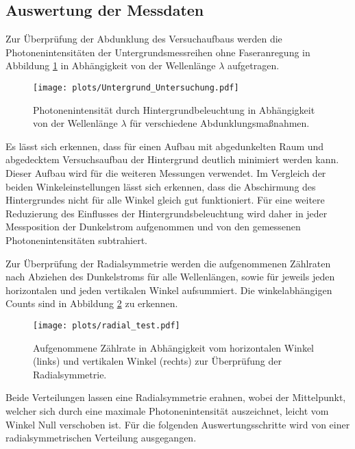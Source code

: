 \subsection{Auswertung der Messdaten}
Zur Überprüfung der Abdunklung des Versuchaufbaus werden die Photonenintensitäten der Untergrundsmessreihen ohne Faseranregung in Abbildung \ref{fig:Untergrund_Untersuchung} in Abhängigkeit von der Wellenlänge $\lambda$ aufgetragen.
\begin{figure}
    \centering
    \texttt{[image: plots/Untergrund\_Untersuchung.pdf]}
    \caption{Photonenintensität durch Hintergrundbeleuchtung in Abhängigkeit von der Wellenlänge $\lambda$ für verschiedene Abdunklungsmaßnahmen.}
    \label{fig:Untergrund_Untersuchung}
\end{figure}
\FloatBarrier
Es lässt sich erkennen, dass für einen Aufbau mit abgedunkelten Raum und abgedecktem Versuchsaufbau der Hintergrund deutlich minimiert werden kann. Dieser Aufbau wird für die weiteren Messungen verwendet. 
Im Vergleich der beiden Winkeleinstellungen lässt sich erkennen, dass die Abschirmung des Hintergrundes nicht für alle Winkel gleich gut funktioniert. 
Für eine weitere Reduzierung des Einflusses der Hintergrundsbeleuchtung wird daher in jeder Messposition der Dunkelstrom aufgenommen und von den gemessenen Photonenintensitäten subtrahiert.

Zur Überprüfung der Radialsymmetrie werden die aufgenommenen Zählraten nach Abziehen des Dunkelstroms für alle Wellenlängen, sowie für jeweils jeden horizontalen und jeden vertikalen Winkel aufsummiert. Die winkelabhängigen Counts sind in Abbildung \ref{fig:radial_test} zu erkennen. 
\begin{figure}
    \centering
    \texttt{[image: plots/radial\_test.pdf]}
    \caption{Aufgenommene Zählrate in Abhängigkeit vom horizontalen Winkel (links) und vertikalen Winkel (rechts) zur Überprüfung der Radialsymmetrie.}
    \label{fig:radial_test}
\end{figure}
\FloatBarrier
Beide Verteilungen lassen eine Radialsymmetrie erahnen, wobei der Mittelpunkt, welcher sich durch eine maximale Photonenintensität auszeichnet, leicht vom Winkel Null verschoben ist. Für die folgenden Auswertungsschritte wird von einer radialsymmetrischen Verteilung ausgegangen.


